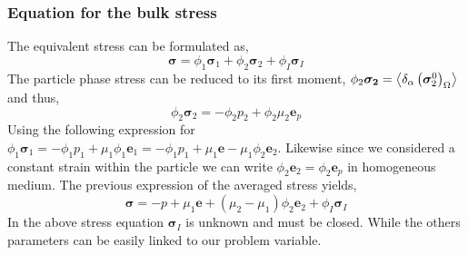 \subsubsection*{Equation for the bulk stress}

The equivalent stress can be formulated as, 
\begin{equation*}
    \bm{\sigma}
    = 
    \phi_1 \bm{\sigma}_1
    + \phi_2 \bm{\sigma}_2
    + \phi_I \bm{\sigma}_I
    \label{eq:sigma_def}
\end{equation*}
The particle phase stress can be reduced to its first moment, $\phi_2 \bm{\sigma_2} = \left<\delta_\alpha \left( \bm{\sigma}_2^0 \right)_\Omega\right>$ and thus, 
\begin{equation*}
    \phi_2 \bm{\sigma}_2 
    = - \phi_2 p_2
    + \phi_2 \mu_2 \textbf{e}_p 
\end{equation*}
Using the following expression for $\phi_1 \bm{\sigma}_1 = - \phi_1 p_1 + \mu_1 \phi_1 \textbf{e}_1 =  - \phi_1 p_1 + \mu_1 \textbf{e} - \mu_1 \phi_2 \textbf{e}_2$.
Likewise since we considered a constant strain within the particle we can write $\phi_2\textbf{e}_2 = \phi_2 \textbf{e}_p$ in homogeneous medium.   
The previous expression of the averaged stress yields, 
\begin{equation*}
    \bm{\sigma}
    = 
    - p 
    + \mu_1 \textbf{e} 
    + (\mu_2 - \mu_1) \phi_2 \textbf{e}_2
    + \phi_I \bm{\sigma}_I
    \label{eq:sigma_def}
\end{equation*}
In the above stress equation $\bm{\sigma}_I$ is unknown and must be closed. 
While the others parameters can be easily linked to our problem variable. 

